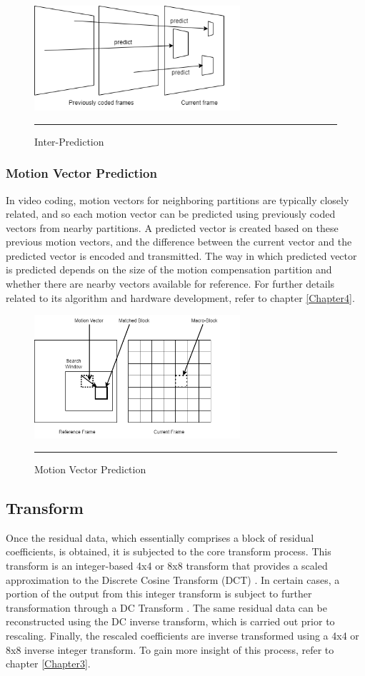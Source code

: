 \begin{figure}[H]
	\centering
	\includegraphics[width = 3in]{./Figures/interprediction.png}
	\rule{35em}{0.5pt}
	\caption{Inter-Prediction}
	\label{fig:interprediction}
\end{figure}

\subsubsection{Motion Vector Prediction}
In video coding, motion vectors for neighboring partitions are typically closely related, and so each motion vector can be predicted using previously coded vectors from nearby partitions. A predicted vector is created based on these previous motion vectors, and the difference between the current vector and the predicted vector is encoded and transmitted. The way in which predicted vector is predicted depends on the size of the motion compensation partition and whether there are nearby vectors available for reference. For further details related to its algorithm and hardware development, refer to chapter \ref{Chapter4}.

\begin{figure}[H]
	\centering
	\includegraphics[width = 3in]{./Figures/motionvector.png}
	\rule{35em}{0.5pt}
	\caption{Motion Vector Prediction}
	\label{fig:motionvector}
\end{figure}

\subsection{Transform}
Once the residual data, which essentially comprises a block of residual coefficients, is obtained, it is subjected to the core transform process. This transform is an integer-based 4x4 or 8x8 transform that provides a scaled approximation to the Discrete Cosine Transform (DCT) \cite{richardson2010h264}. In certain cases, a portion of the output from this integer transform is subject to further transformation through a DC Transform \cite{richardson2010h264}. The same residual data can be reconstructed using the DC inverse transform, which is carried out prior to rescaling. Finally, the rescaled coefficients are inverse transformed using a 4x4 or 8x8 inverse integer transform. To gain more insight of this process, refer to chapter \ref{Chapter3}.

